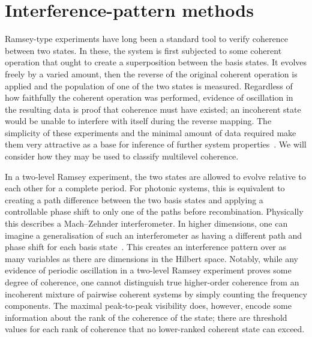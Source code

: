 \section{Interference-pattern methods}

Ramsey-type experiments have long been a standard tool to verify coherence between two states.
In these, the system is first subjected to some coherent operation that ought to create a superposition between the basis states.
It evolves freely by a varied amount, then the reverse of the original coherent operation is applied and the population of one of the two states is measured.
Regardless of how faithfully the coherent operation was performed, evidence of oscillation in the resulting data is proof that coherence must have existed; an incoherent state would be unable to interfere with itself during the reverse mapping.
The simplicity of these experiments and the minimal amount of data required make them very attractive as a base for inference of further system properties~\cite{Oi2006}.
We will consider how they may be used to classify multilevel coherence.

In a two-level Ramsey experiment, the two states are allowed to evolve relative to each other for a complete period.
For photonic systems, this is equivalent to creating a path difference between the two basis states and applying a controllable phase shift to only one of the paths before recombination.
Physically this describes a Mach--Zehnder interferometer.
In higher dimensions, one can imagine a generalisation of such an interferometer as having a different path and phase shift for each basis state~\cite{vonPrillwitz2015}.
This creates an interference pattern over as many variables as there are dimensions in the Hilbert space.
Notably, while any evidence of periodic oscillation in a two-level Ramsey experiment proves some degree of coherence, one cannot distinguish true higher-order coherence from an incoherent mixture of pairwise coherent systems by simply counting the frequency components.
The maximal peak-to-peak visibility does, however, encode some information about the rank of the coherence of the state; there are threshold values for each rank of coherence that no lower-ranked coherent state can exceed.

